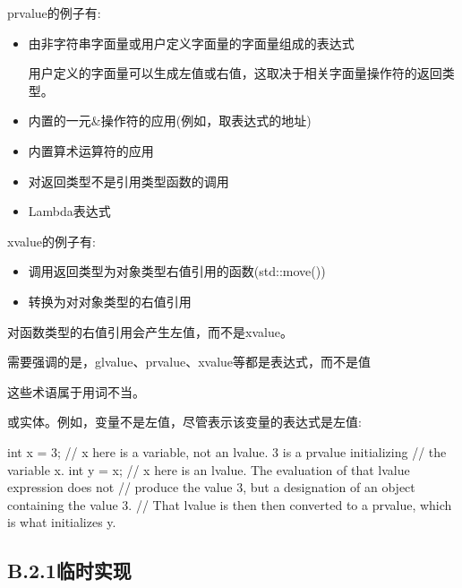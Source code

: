 prvalue的例子有:

\begin{itemize}
\item 
由非字符串字面量或用户定义字面量的字面量组成的表达式

\begin{notice}用户定义的字面量可以生成左值或右值，这取决于相关字面量操作符的返回类型。
\end{notice}

\item 
内置的一元\&操作符的应用(例如，取表达式的地址)

\item 
内置算术运算符的应用

\item 
对返回类型不是引用类型函数的调用

\item 
Lambda表达式
\end{itemize}

xvalue的例子有:

\begin{itemize}
\item 
调用返回类型为对象类型右值引用的函数(std::move())

\item 
转换为对对象类型的右值引用
\end{itemize}

对函数类型的右值引用会产生左值，而不是xvalue。

需要强调的是，glvalue、prvalue、xvalue等都是表达式，而不是值

\begin{notice}这些术语属于用词不当。
\end{notice}

或实体。例如，变量不是左值，尽管表示该变量的表达式是左值:

\begin{cpp}
int x = 3; // x here is a variable, not an lvalue. 3 is a prvalue initializing
		  // the variable x.
int y = x; // x here is an lvalue. The evaluation of that lvalue expression does not
		  // produce the value 3, but a designation of an object containing the value 3.
		  // That lvalue is then then converted to a prvalue, which is what initializes y.
\end{cpp}

\subsection{B.2.1\hspace{0.2cm}临时实现}

